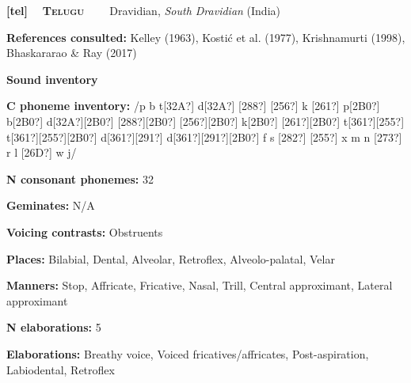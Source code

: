 \clearpage\begin{styleBody}
\textbf{[tel] }\ \ \textbf{\textsc{Telugu}}\textbf{\ \ \ \ }Dravidian, \textit{South Dravidian} (India)
\end{styleBody}

\begin{styleBody}
\textbf{References consulted: }Kelley (1963), Kostić et al. (1977), Krishnamurti (1998), Bhaskararao \& Ray (2017)
\end{styleBody}

\begin{styleBody}
\textbf{Sound inventory}
\end{styleBody}

\begin{styleBody}
\textbf{C phoneme inventory:} /p b t[32A?] d[32A?] [288?] [256?] k [261?] p[2B0?] b[2B0?] d[32A?][2B0?] [288?][2B0?] [256?][2B0?] k[2B0?] [261?][2B0?] t[361?][255?] t[361?][255?][2B0?] d[361?][291?] d[361?][291?][2B0?] f s [282?] [255?] x m n [273?] r l [26D?] w j/
\end{styleBody}

\begin{styleBody}
\textbf{N consonant phonemes:} 32
\end{styleBody}

\begin{styleBody}
\textbf{Geminates:} N/A
\end{styleBody}

\begin{styleBody}
\textbf{Voicing contrasts:} Obstruents
\end{styleBody}

\begin{styleBody}
\textbf{Places:} Bilabial, Dental, Alveolar, Retroflex, Alveolo-palatal, Velar
\end{styleBody}

\begin{styleBody}
\textbf{Manners:} Stop, Affricate, Fricative, Nasal, Trill, Central approximant, Lateral approximant
\end{styleBody}

\begin{styleBody}
\textbf{N elaborations:} 5
\end{styleBody}

\begin{styleBody}
\textbf{Elaborations:} Breathy voice, Voiced fricatives/affricates, Post-aspiration, Labiodental, Retroflex
\end{styleBody}

